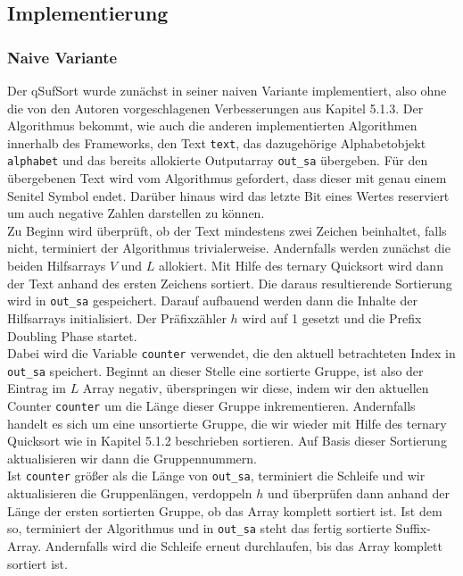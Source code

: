 \subsection{Implementierung}
\subsubsection{Naive Variante}
Der qSufSort wurde zunächst in seiner naiven Variante implementiert, also ohne die von den Autoren vorgeschlagenen Verbesserungen aus Kapitel 5.1.3. Der Algorithmus bekommt, wie auch die anderen implementierten Algorithmen innerhalb des Frameworks, den Text \texttt{text}, das dazugehörige Alphabetobjekt \texttt{alphabet} und das bereits allokierte Outputarray \texttt{out_sa} übergeben. Für den übergebenen Text wird vom Algorithmus gefordert, dass dieser mit genau einem Senitel Symbol endet. Darüber hinaus wird das letzte Bit eines Wertes reserviert um auch negative Zahlen darstellen zu können.\\
Zu Beginn wird überprüft, ob der Text mindestens zwei Zeichen beinhaltet, falls nicht, terminiert der Algorithmus trivialerweise. Andernfalls werden zunächst die beiden Hilfsarrays $V$ und $L$ allokiert. Mit Hilfe des ternary Quicksort wird dann der Text anhand des ersten Zeichens sortiert. Die daraus resultierende Sortierung wird in \texttt{out_sa} gespeichert. Darauf aufbauend werden dann die Inhalte der Hilfsarrays initialisiert. Der Präfixzähler $h$ wird auf 1 gesetzt und die Prefix Doubling Phase startet. \\
Dabei wird die Variable \texttt{counter} verwendet, die den aktuell betrachteten Index in \texttt{out_sa} speichert. Beginnt an dieser Stelle eine sortierte Gruppe, ist also der Eintrag im $L$ Array negativ, überspringen wir diese, indem wir den aktuellen Counter \texttt{counter} um die Länge dieser Gruppe inkrementieren. Andernfalls handelt es sich um eine unsortierte Gruppe, die wir wieder mit Hilfe des ternary Quicksort wie in Kapitel 5.1.2 beschrieben sortieren. Auf Basis dieser Sortierung aktualisieren wir dann die Gruppennummern.\\ 
Ist \texttt{counter} größer als die Länge von \texttt{out_sa}, terminiert die Schleife und wir aktualisieren die Gruppenlängen, verdoppeln $h$ und überprüfen dann anhand der Länge der ersten sortierten Gruppe, ob das Array komplett sortiert ist. Ist dem so, terminiert der Algorithmus und in \texttt{out_sa} steht das fertig sortierte Suffix-Array. Andernfalls wird die Schleife erneut durchlaufen, bis das Array komplett sortiert ist.\\
